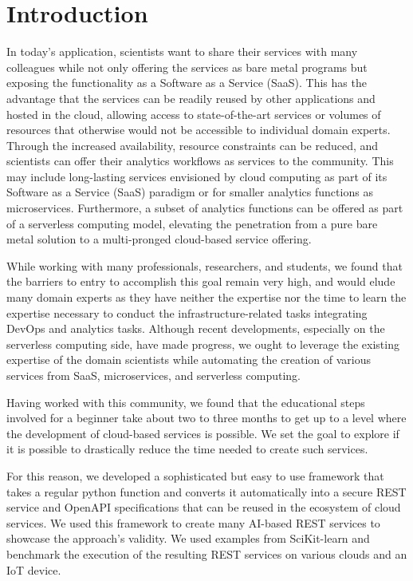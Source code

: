 
\newcommand{\Cloudmesh}{XXXXXXXXX}

\section{Introduction}


In today's application, scientists want to share their services with many colleagues while not only offering the services as bare metal programs but exposing the functionality as a Software as a Service (SaaS). This has the advantage that the services can be readily reused by other applications and hosted in the cloud, allowing access to state-of-the-art services or volumes of resources that otherwise would not be accessible to individual domain experts. Through the increased availability, resource constraints can be reduced, and scientists can offer their analytics workflows as services to the community. This may include long-lasting services envisioned by cloud computing as part of its Software as a Service (SaaS) paradigm or for smaller analytics functions as microservices. Furthermore, a subset of analytics functions can be offered as part of a serverless computing model, elevating the penetration from a pure bare metal solution to a multi-pronged cloud-based service offering.

While working with many professionals, researchers, and students, we found that the barriers to entry to accomplish this goal remain very high, and would elude many domain experts as they have neither the expertise nor the time to learn the expertise necessary to conduct the infrastructure-related tasks integrating DevOps and analytics tasks. Although recent developments, especially on the serverless computing side, have made progress, we ought to leverage the existing expertise of the domain scientists while automating the creation of various services from SaaS, microservices, and serverless computing.

Having worked with this community, we found that the educational steps involved for a beginner take about two to three months to get up to a level where the development of cloud-based services is possible. We set the goal to explore if it is possible to drastically reduce the time needed to create such services.

For this reason, we developed a sophisticated but easy to use framework that takes a regular python function and converts it automatically into a secure REST service and OpenAPI specifications \cite{openapi} that can be reused in the ecosystem of cloud services. We used this framework to create many AI-based REST services to showcase the approach's validity. We used examples from SciKit-learn \cite{scikit-learn} and benchmark the execution of the resulting REST services on various clouds and an IoT device. 

